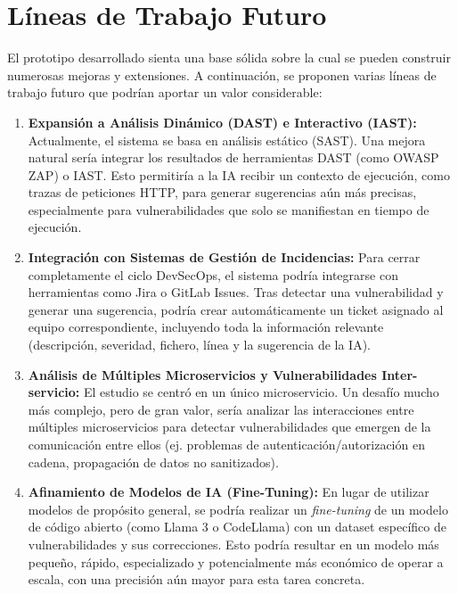 \section{Líneas de Trabajo Futuro}\label{sec:trabajofuturo}

El prototipo desarrollado sienta una base sólida sobre la cual se pueden construir numerosas mejoras y extensiones. A continuación, se proponen varias líneas de trabajo futuro que podrían aportar un valor considerable:

\begin{enumerate}
    \item \textbf{Expansión a Análisis Dinámico (DAST) e Interactivo (IAST):} Actualmente, el sistema se basa en análisis estático (SAST). Una mejora natural sería integrar los resultados de herramientas DAST (como OWASP ZAP) o IAST. Esto permitiría a la IA recibir un contexto de ejecución, como trazas de peticiones HTTP, para generar sugerencias aún más precisas, especialmente para vulnerabilidades que solo se manifiestan en tiempo de ejecución.

    \item \textbf{Integración con Sistemas de Gestión de Incidencias:} Para cerrar completamente el ciclo DevSecOps, el sistema podría integrarse con herramientas como Jira o GitLab Issues. Tras detectar una vulnerabilidad y generar una sugerencia, podría crear automáticamente un ticket asignado al equipo correspondiente, incluyendo toda la información relevante (descripción, severidad, fichero, línea y la sugerencia de la IA).

    \item \textbf{Análisis de Múltiples Microservicios y Vulnerabilidades Inter-servicio:} El estudio se centró en un único microservicio. Un desafío mucho más complejo, pero de gran valor, sería analizar las interacciones entre múltiples microservicios para detectar vulnerabilidades que emergen de la comunicación entre ellos (ej. problemas de autenticación/autorización en cadena, propagación de datos no sanitizados).

    \item \textbf{Afinamiento de Modelos de IA (Fine-Tuning):} En lugar de utilizar modelos de propósito general, se podría realizar un \textit{fine-tuning} de un modelo de código abierto (como Llama 3 o CodeLlama) con un dataset específico de vulnerabilidades y sus correcciones. Esto podría resultar en un modelo más pequeño, rápido, especializado y potencialmente más económico de operar a escala, con una precisión aún mayor para esta tarea concreta.


\end{enumerate}
